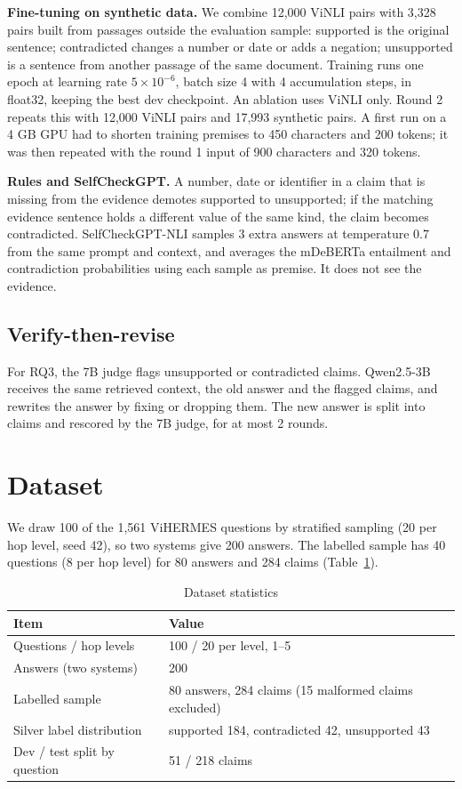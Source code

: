 \documentclass[conference]{IEEEtran}
\begin{document}
\textbf{Fine-tuning on synthetic data.} We combine 12,000 ViNLI \cite{vinli} pairs with 3,328 pairs built from passages outside the evaluation sample: supported is the original sentence; contradicted changes a number or date or adds a negation; unsupported is a sentence from another passage of the same document. Training runs one epoch at learning rate $5\times10^{-6}$, batch size 4 with 4 accumulation steps, in float32, keeping the best dev checkpoint. An ablation uses ViNLI only. Round 2 repeats this with 12,000 ViNLI pairs and 17,993 synthetic pairs. A first run on a 4 GB GPU had to shorten training premises to 450 characters and 200 tokens; it was then repeated with the round 1 input of 900 characters and 320 tokens.

\textbf{Rules and SelfCheckGPT.} A number, date or identifier in a claim that is missing from the evidence demotes supported to unsupported; if the matching evidence sentence holds a different value of the same kind, the claim becomes contradicted. SelfCheckGPT-NLI \cite{selfcheck} samples 3 extra answers at temperature 0.7 from the same prompt and context, and averages the mDeBERTa entailment and contradiction probabilities using each sample as premise. It does not see the evidence.

\subsection{Verify-then-revise}
For RQ3, the 7B judge flags unsupported or contradicted claims. Qwen2.5-3B receives the same retrieved context, the old answer and the flagged claims, and rewrites the answer by fixing or dropping them. The new answer is split into claims and rescored by the 7B judge, for at most 2 rounds.

\section{Dataset}
We draw 100 of the 1,561 ViHERMES questions by stratified sampling (20 per hop level, seed 42), so two systems give 200 answers. The labelled sample has 40 questions (8 per hop level) for 80 answers and 284 claims (Table~\ref{tab:data}).

\begin{table}[t]
\caption{Dataset statistics}
\label{tab:data}
\centering
\footnotesize
\begin{tabular}{p{}p{}}
\toprule
Item & Value \\
\midrule
Questions / hop levels & 100 / 20 per level, 1--5 \\
Answers (two systems) & 200 \\
Labelled sample & 80 answers, 284 claims (15 malformed claims excluded) \\
Silver label distribution & supported 184, contradicted 42, unsupported 43 \\
Dev / test split by question & 51 / 218 claims \\
\bottomrule
\end{tabular}
\end{table}
\end{document}

